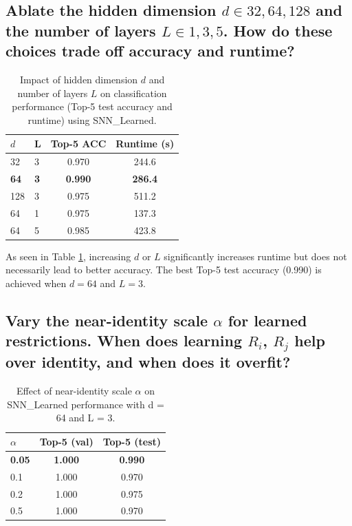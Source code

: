 \documentclass[11pt]{article}
\begin{document}
\subsection{Ablate the hidden dimension $d \in {32, 64, 128}$ and the number of layers $L \in {1, 3, 5}$. 
How do these choices trade off accuracy and runtime?}

    \begin{table}[h!]
    \centering
    \begin{tabular}{llcc}
    \toprule
    \textbf{$d$} & \textbf{L} & \textbf{Top-5 ACC} & \textbf{Runtime (s)} \\
    \midrule
    32  & 3  & 0.970 & 244.6 \\
    \textbf{64}  & \textbf{3}  & \textbf{0.990} & \textbf{286.4} \\
    128 & 3  & 0.975 & 511.2 \\
    64  & 1  & 0.975 & 137.3 \\
    64  & 5  & 0.985 & 423.8 \\
    \bottomrule
    \end{tabular}
    \caption{Impact of hidden dimension $d$ and number of layers $L$ on classification performance (Top-5 test accuracy and runtime) using SNN\_Learned.}
    \label{tab:d_L}
    \end{table}

    As seen in Table \ref{tab:d_L}, increasing $d$ or $L$ significantly increases runtime but does not necessarily lead to better accuracy.
    The best Top-5 test accuracy (0.990) is achieved when $d = 64$ and $L = 3$.

\subsection{Vary the near-identity scale $\alpha$ for learned restrictions.
When does learning $R_i$, $R_j$ help over identity, and when does it overfit?} 

    \begin{table}[h!]
    \centering
    \begin{tabular}{lcc}
    \toprule
    \textbf{$\alpha$} & \textbf{Top-5 (val)} & \textbf{Top-5 (test)} \\
    \midrule
    \textbf{0.05} & \textbf{1.000} & \textbf{0.990} \\
    0.1  & 1.000 & 0.970 \\
    0.2  & 1.000 & 0.975 \\
    0.5  & 1.000 & 0.970 \\
    \bottomrule
    \end{tabular}  
    \caption{Effect of near-identity scale $\alpha$ on SNN\_Learned performance with d = 64 and L = 3.}
    \label{tab:alpha}
    \end{table}
\end{document}
